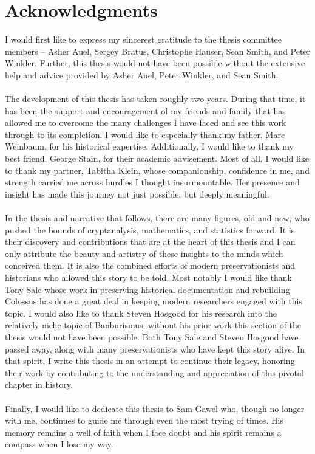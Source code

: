 \documentclass{dcthesis}
\theoremstyle{definition}
\theoremstyle{remark}
\begin{document}
\chapter*{Acknowledgments}
I would first like to express my sincerest gratitude to the thesis committee members -- Asher Auel, Sergey Bratus, Christophe Hauser, Sean Smith, and Peter Winkler. Further, this thesis would not have been possible without the extensive help and advice provided by Asher Auel, Peter Winkler, and Sean Smith.
\\\\The development of this thesis has taken roughly two years. During that time, it has been the support and encouragement of my friends and family that has allowed me to overcome the many challenges I have faced and see this work through to its completion. I would like to especially thank my father, Marc Weinbaum, for his historical expertise. Additionally, I would like to thank my best friend, George Stain, for their academic advisement. Most of all, I would like to thank my partner, Tabitha Klein, whose companionship, confidence in me, and strength carried me across hurdles I thought insurmountable. Her presence and insight has made this journey not just possible, but deeply meaningful. 
\\\\In the thesis and narrative that follows, there are many figures, old and new, who pushed the bounds of cryptanalysis, mathematics, and statistics forward. It is their discovery and contributions that are at the heart of this thesis and I can only attribute the beauty and artistry of these insights to the minds which conceived them. It is also the combined efforts of modern preservationists and historians who allowed this story to be told. Most notably I would like thank Tony Sale whose work in preserving historical documentation and rebuilding Colossus has done a great deal in keeping modern researchers engaged with this topic. I would also like to thank Steven Hosgood for his research into the relatively niche topic of Banburismus; without his prior work this section of the thesis would not have been possible. Both Tony Sale and Steven Hosgood have passed away, along with many preservationists who have kept this story alive. In that spirit, I write this thesis in an attempt to continue their legacy, honoring their work by contributing to the understanding and appreciation of this pivotal chapter in history.
\\\\Finally, I would like to dedicate this thesis to Sam Gawel who, though no longer with me, continues to guide me through even the most trying of times. His memory remains a well of faith when I face doubt and his spirit remains a compass when I lose my way. 
\end{document}
